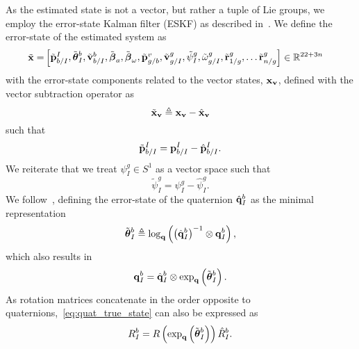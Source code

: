 As the estimated state is not a vector, but rather a tuple of Lie groups, we
employ the error-state Kalman filter (ESKF) as described in~\cite{koch2017relative}.
We define the error-state of the estimated system as
\begin{align*}
  \tilde{\boldsymbol{\mathrm{x}}} =&
  \left[ \begin{matrix}
    \tilde{\boldsymbol{\mathrm{p}}}_{b/I}^{I}, \tilde{\boldsymbol{\mathrm{\theta}}}_I^{b}, \tilde{\boldsymbol{\mathrm{v}}}_{b/I}^b,
    \tilde{\boldsymbol{\mathrm{\beta}}}_a,
    \tilde{\boldsymbol{\mathrm{\beta}}}_{\omega},
    \tilde{\boldsymbol{\mathrm{p}}}_{g/b}^{v}, \tilde{\boldsymbol{\mathrm{v}}}_{g/I}^{g}, \tilde{\psi}_{I}^{g},
    \tilde{\omega}_{g/I}^{g},
      \tilde{\boldsymbol{\mathrm{r}}}_{1/g}^{g}, \dots \tilde{\boldsymbol{\mathrm{r}}}_{n/g}^{g}
  \end{matrix} \right]
  \in \mathbb{R}^{22 + 3n}
\end{align*}
with the error-state components related to the vector states, $\boldsymbol{\mathrm{x}}_{\boldsymbol{\mathrm{v}}}$, defined with
the vector subtraction operator as
\begin{equation}
\tilde{\boldsymbol{\mathrm{x}}}_{\boldsymbol{\mathrm{v}}} \triangleq \boldsymbol{\mathrm{x}}_{\boldsymbol{\mathrm{v}}} - \hat{\boldsymbol{\mathrm{x}}}_{\boldsymbol{\mathrm{v}}}
\label{eq:est_paper_vector_error_state}
\end{equation}
such that
\begin{equation}
  \tilde{\boldsymbol{\mathrm{p}}}_{b/I}^I = \boldsymbol{\mathrm{p}}_{b/I}^I - \hat{\boldsymbol{\mathrm{p}}}_{b/I}^I.
  \label{eq:est_paper_uav_pos_err_state}
\end{equation}
We reiterate that we treat $\psi_I^g \in S^1$ as a vector space such that
\begin{equation}
  \tilde{\psi}_I^g = \psi_I^g - \hat{\psi}_I^g.
\end{equation}
We follow~\cite{koch2017relative}, defining the error-state of the quaternion
$\hat{\boldsymbol{\mathrm{q}}}_I^b$ as the minimal representation
\begin{equation}
  \tilde{\boldsymbol{\mathrm{\theta}}}_I^b \triangleq \log_{\boldsymbol{\mathrm{q}}} \left( \left( \hat{\boldsymbol{\mathrm{q}}}_I^b \right)^{-1}
  \otimes \boldsymbol{\mathrm{q}}_I^b \right),
  \label{eq:quat_error_state}
\end{equation}
which also results in
\begin{equation}
  \boldsymbol{\mathrm{q}}_I^b  = \hat{\boldsymbol{\mathrm{q}}}_I^b \otimes \exp_{\boldsymbol{\mathrm{q}}} \left( \tilde{\boldsymbol{\mathrm{\theta}}}_I^b
  \right).
  \label{eq:quat_true_state}
\end{equation}
As rotation matrices concatenate in the order opposite to
quaternions,~\eqref{eq:quat_true_state} can also be expressed as
\begin{equation}
  R_I^b  = R \left( \exp_{\boldsymbol{\mathrm{q}}} \left( \tilde{\boldsymbol{\mathrm{\theta}}}_I^b \right) \right)
  \hat{R}_I^b.
  \label{eq:rot_true_state}
\end{equation}

